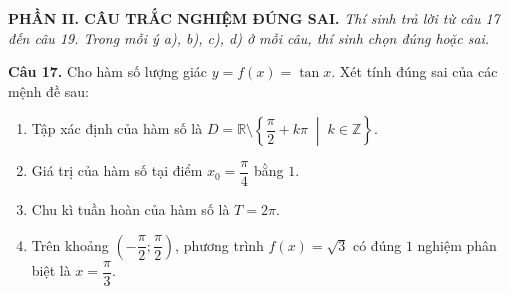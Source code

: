 \documentclass[12pt, a4paper]{article}
\newcommand{\cau}[1]{\vspace{0.12cm}\noindent\textbf{Câu #1. }}
\newcommand{\PhanII}{
\vspace{0.3cm}
\noindent\textbf{\large\sffamily PHẦN II. CÂU TRẮC NGHIỆM ĐÚNG SAI.}
\textit{Thí sinh trả lời từ câu 17 đến câu 19. Trong mỗi ý a), b), c), d) ở mỗi câu, thí sinh chọn đúng hoặc sai.}\par\vspace{0.2cm}
}
\begin{document}
\PhanII

\cau{17} Cho hàm số lượng giác $y = f(x) = \tan x$. Xét tính đúng sai của các mệnh đề sau:
\begin{enumerate}[label=\alph*),leftmargin=*]
\item Tập xác định của hàm số là $D = \mathbb{R}\setminus\left\{\dfrac{\pi}{2} + k\pi \;\middle|\; k\in\mathbb{Z}\right\}$.
\item Giá trị của hàm số tại điểm $x_0 = \dfrac{\pi}{4}$ bằng $1$.
\item Chu kì tuần hoàn của hàm số là $T = 2\pi$.
\item Trên khoảng $\left(-\dfrac{\pi}{2}; \dfrac{\pi}{2}\right)$, phương trình $f(x) = \sqrt{3}$ có đúng $1$ nghiệm phân biệt là $x = \dfrac{\pi}{3}$.
\end{enumerate}
\end{document}
